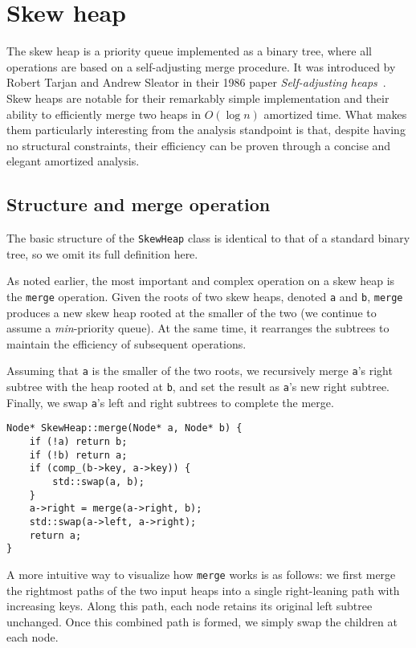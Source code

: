 \section{Skew heap}

The skew heap is a priority queue implemented as a binary tree, where all operations are based on a self-adjusting merge procedure. It was introduced by Robert Tarjan and Andrew Sleator in their 1986 paper \emph{Self-adjusting heaps}~\cite{SleatorTarjan1986}. Skew heaps are notable for their remarkably simple implementation and their ability to efficiently merge two heaps in \( O(\log n) \) amortized time. What makes them particularly interesting from the analysis standpoint is that, despite having no structural constraints, their efficiency can be proven through a concise and elegant amortized analysis.

\subsection{Structure and merge operation}

The basic structure of the \texttt{SkewHeap} class is identical to that of a standard binary tree, so we omit its full definition here.

As noted earlier, the most important and complex operation on a skew heap is the \texttt{merge} operation. Given the roots of two skew heaps, denoted \texttt{a} and \texttt{b}, \texttt{merge} produces a new skew heap rooted at the smaller of the two (we continue to assume a \emph{min}-priority queue). At the same time, it rearranges the subtrees to maintain the efficiency of subsequent operations.

Assuming that \texttt{a} is the smaller of the two roots, we recursively merge \texttt{a}'s right subtree with the heap rooted at \texttt{b}, and set the result as \texttt{a}'s new right subtree. Finally, we swap \texttt{a}'s left and right subtrees to complete the merge.

\begin{verbatim}
Node* SkewHeap::merge(Node* a, Node* b) {
    if (!a) return b;
    if (!b) return a;
    if (comp_(b->key, a->key)) {
        std::swap(a, b);
    }
    a->right = merge(a->right, b);
    std::swap(a->left, a->right);
    return a;
}
\end{verbatim}

A more intuitive way to visualize how \texttt{merge} works is as follows: we first merge the rightmost paths of the two input heaps into a single right-leaning path with increasing keys. Along this path, each node retains its original left subtree unchanged. Once this combined path is formed, we simply swap the children at each node.

